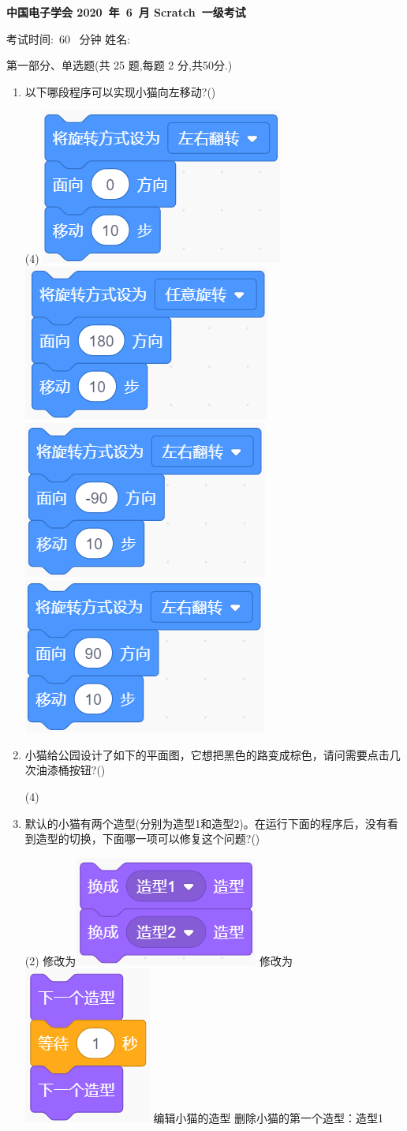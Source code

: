 \documentclass[10pt, a4paper]{article}
\newcommand{\Title}[3]{
    \begin{center}
        \Large \textbf{中国电子学会 #1~年~#2~月 Scratch~#3级考试}
    \end{center}
}
\newcommand{\TimeAndName}[1]{
    \begin{center}
        考试时间:~#1~ 分钟 \qquad\qquad\qquad\qquad 姓名:\underline{\quad\quad\quad\quad}
    \end{center}
}
\begin{document}
    \Title{2020}{6}{一}
    
    \TimeAndName{60}
    
    {\noindent\heiti 第一部分、单选题(共 25 题,每题 2 分,共50分.)}

    \begin{enumerate}
        \item 以下哪段程序可以实现小猫向左移动?(\qquad)
        \begin{tasks}(4)
            \task \includegraphics[width=.15\textwidth]{1a.png}
            \task \includegraphics[width=.15\textwidth]{1b.png}
            \task \includegraphics[width=.15\textwidth]{1c.png}
            \task \includegraphics[width=.15\textwidth]{1d.png}
        \end{tasks}

        \item 小猫给公园设计了如下的平面图，它想把黑色的路变成棕色，请问需要点击几次油漆桶按钮?(\qquad)
        \begin{tasks}(4)
        \end{tasks}

        \item 默认的小猫有两个造型(分别为造型1和造型2)。在运行下面的程序后，没有看到造型的切换，下面哪一项可以修复这个问题?(\qquad)
        \begin{tasks}(2)
            \task 修改为\includegraphics[width=.12\textwidth]{3a.png}
            \task 修改为\includegraphics[width=.08\textwidth]{3b.png}
            \task 编辑小猫的造型
            \task 删除小猫的第一个造型：造型1
        \end{tasks}


\end{enumerate}
\end{document}
